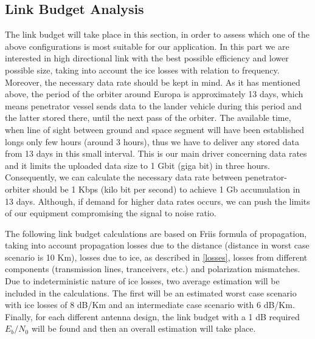 \subsection{Link Budget Analysis}

The link budget will take place in this section, in order to assess which one of the above configurations is most suitable for our application. In this part we are interested in high directional link with the best possible efficiency and lower possible size, taking into account the ice losses with relation to frequency. Moreover, the necessary data rate should be kept in mind. As it has mentioned above, the period of the orbiter around Europa is approximately 13 days, which means penetrator vessel sends data to the lander vehicle during this period and the latter stored there, until the next pass of the orbiter. The available time, when line of sight between ground and space segment will have been established longs only few hours (around 3 hours), thus we have to deliver any stored data from 13 days in this small interval. This is our main driver concerning data rates and it limits the uploaded data size to 1 Gbit (giga bit) in three hours. Consequently, we can calculate the necessary data rate between penetrator-orbiter should be 1 Kbps (kilo bit per second) to achieve 1 Gb accumulation in 13 days. Although, if demand for higher data rates occurs, we can push the limits of our equipment compromising the signal to noise ratio.

The following link budget calculations are based on Friis formula of propagation, taking into account propagation losses due to the distance (distance in worst case scenario is 10 Km), losses due to ice, as described in \ref{losses}, losses from different components (transmission lines, tranceivers, etc.) and polarization mismatches. Due to indeterministic nature of ice losses, two average estimation will be included in the calculations. The first will be an estimated worst case scenario with ice losses of 8 dB/Km and an intermediate case scenario with 6 dB/Km. Finally, for each different antenna design, the link budget with a 1 dB required $E_{b}/N_{0}$ will be found and then an overall estimation will take place. 

